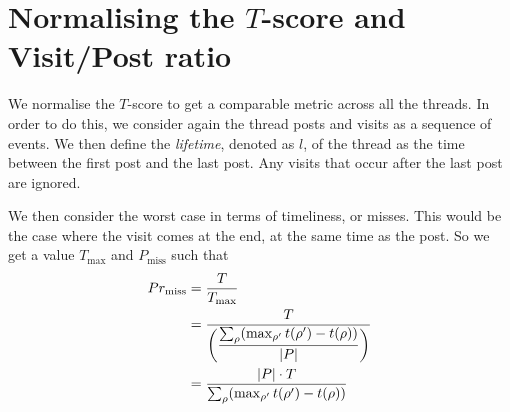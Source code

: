 
%
%
%

\section{Normalising the $T$-score and Visit/Post ratio}
We normalise the $T$-score to get a comparable metric across all the threads. In 
order to do this, we consider again the thread posts and visits as a sequence of 
events. We then define the \emph{lifetime}, denoted as $l$, of the thread as the 
time between the first post and the last post. Any visits that occur after the 
last post are ignored.

We then consider the worst case in terms of timeliness, or misses. This would be 
the case where the visit comes at the end, at the same time as the post. So we 
get a value $T_{\max}$ and $P_{\text{miss}}$ such that
\begin{align*}
	\P_{\text{miss}} &= \frac{T}{T_{\max}}\\
							  &= \dfrac{T}{\left(
					\dfrac{%
			\sum_\post (\max_{\post'}t(\post') - t(\post))}{|P|}\right)} \\
					&= \dfrac{|P| \cdot T}{%
		\sum_\post (\max_{\post'}t(\post') - t(\post))}
\end{align*}


